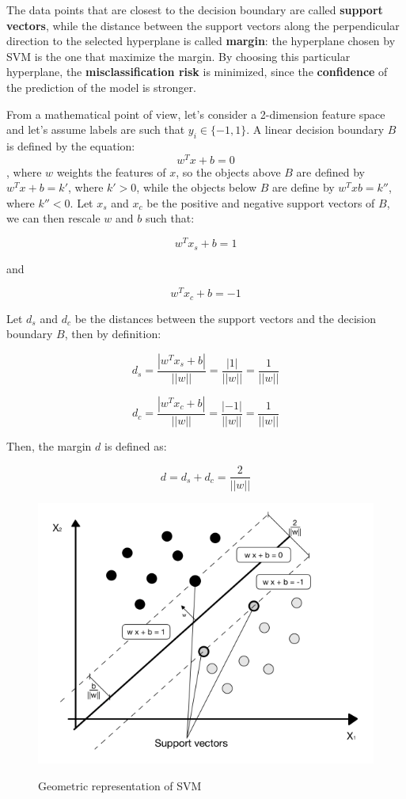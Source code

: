 The data points that are closest to the decision boundary are called \textbf{support vectors}, while the distance between the support vectors along the perpendicular direction to the selected hyperplane is called \textbf{margin}: the hyperplane chosen by SVM is the one that maximize the margin. By choosing this particular hyperplane, the \textbf{misclassification risk} is minimized, since the \textbf{confidence} of the prediction of the model is stronger.

From a mathematical point of view, let's consider a 2-dimension feature space and let's assume labels are such that $y_i \in \{-1, 1\}$. A linear decision boundary $B$ is defined by the equation:
$$
    w^Tx + b = 0
$$
, where $w$ weights the features of $x$, so the objects above $B$ are defined by $w^Tx + b = k'$, where $k' > 0$, while the objects below $B$ are define by $w^Tx  b = k''$, where $k'' < 0$. Let $x_s$ and $x_c$ be the positive and negative support vectors of $B$, we can then rescale $w$ and $b$ such that:

$$
w^Tx_s + b = 1
$$

and 

$$
w^Tx_c + b = -1
$$

Let $d_s$ and $d_c$ be the distances between the support vectors and the decision boundary $B$, then by definition:

$$
d_s = \frac{|w^Tx_s + b|}{||w||} = \frac{|1|}{||w||} = \frac{1}{||w||}
$$

$$
d_c = \frac{|w^Tx_c + b|}{||w||} = \frac{|-1|}{||w||} = \frac{1}{||w||}
$$

Then, the margin $d$ is defined as:

$$
d = d_s + d_c = \frac{2}{||w||}
$$

\begin{figure}[h!]
		\centering
		\includegraphics[scale = 1.0]{img/sv.png}
		\label{svm}
		\caption{Geometric representation of SVM}
\end{figure}

